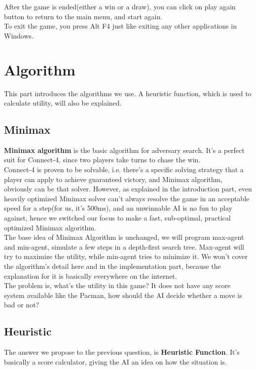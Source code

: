 \documentclass[12pt,a4paper]{article}
\begin{document}
	After the game is ended(either a win or a draw), you can click on play again button to return to the main menu, and start again.\\
	
	To exit the game, you press Alt F4 just like exiting any other applications in Windows.
	
	\section{Algorithm}
	This part introduces the algorithms we use. A heuristic function, which is used to calculate utility, will also be explained.
	
	\subsection{Minimax}
	\textbf{Minimax algorithm} is the basic algorithm for adversary search. It's a perfect suit for Connect-4, since two players take turns to chase the win.\\
	
	Connect-4 is proven to be solvable, i.e. there's a specific solving strategy that a player can apply to achieve guaranteed victory, and Minimax algorithm, obviously can be that solver. However, as explained in the introduction part, even heavily optimized Minimax solver can't always resolve the game in an acceptable speed for a step(for us, it's 500ms), and an unwinnable AI is no fun to play against, hence we switched our focus to make a fast, sub-optimal, practical optimized Minimax algorithm.\\
	
	The base idea of Minimax Algorithm is unchanged, we will program max-agent and min-agent, simulate a few steps in a depth-first search tree. Max-agent will try to maximize the utility, while min-agent tries to minimize it. We won't cover the algorithm's detail here and in the implementation part, because the explanation for it is basically everywhere on the internet.\\
	
	The problem is, what's the utility in this game? It does not have any score system available like the Pacman, how should the AI decide whether a move is bad or not?
	
	\subsection{Heuristic}
	The answer we propose to the previous question, is \textbf{Heuristic Function}. It's basically a score calculator, giving the AI an idea on how the situation is.\\
	
\end{document}
